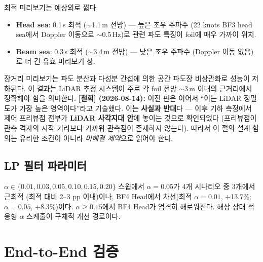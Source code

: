 \documentclass[11pt]{report}
\numberwithin{equation}{chapter}
\numberwithin{figure}{chapter}
\numberwithin{table}{chapter}
\begin{document}
최적 미리보기는 예상외로 짧다:
\begin{itemize}
  \item \textbf{Head sea}: 0.1\,s 최적 ($\sim$1.1\,m 전방) --- 높은 조우 주파수
        (22 knots BF3 head sea에서 Doppler 이동으로 $\sim$0.5\,Hz)로
        관련 파도 특징이 foil에 매우 가까이 위치.
  \item \textbf{Beam sea}: 0.3\,s 최적 ($\sim$3.4\,m 전방) --- 낮은 조우 주파수
        (Doppler 이동 없음)로 더 긴 유효 미리보기 창.
\end{itemize}

장거리 미리보기는 파도 분산과 다성분 간섭에 의한 공간 파도장 비상관화로
성능이 저하된다.
이 결과는 LiDAR 추정 시스템이 주로 각 foil 전방 $\sim$3\,m 이내의 근거리에서
정확해야 함을 의미한다.
\textbf{[철회] (2026-08-14):} 이전 판은 이어서 ``이는 LiDAR 정밀도가 가장 높은
영역이다''라고 기술했다. 이는 \textbf{사실과 반대}다 --- 이후 기하 측정에서
제어 프리뷰점 전부가 \textbf{LiDAR 사각지대 안}에 놓이는 것으로 확인되었다
(프리뷰점이 관측 격자의 시작 거리보다 가까워 관측점이 존재하지 않는다).
따라서 이 절의 설계 함의는 유리한 조건이 아니라 \emph{미해결 제약}으로 읽어야 한다.

\subsection{LP 필터 파라미터}

$\alpha \in \{0.01, 0.03, 0.05, 0.10, 0.15, 0.20\}$ 스윕에서
$\alpha=0.05$가 4개 시나리오 중 3개에서 근최적 (최적 대비 2--3 pp 이내)이나,
BF4 Head에서 차선(최적 $\alpha=0.01$, +13.7\%; $\alpha=0.05$, +8.3\%)이다.
$\alpha \geq 0.15$에서 BF4 Head가 엄격히 해로워진다.
해상 상태 적응형 $\alpha$ 스케줄이 구체적 개선 경로이다.

\section{End-to-End 검증}
\label{sec:e2e}
\end{document}
